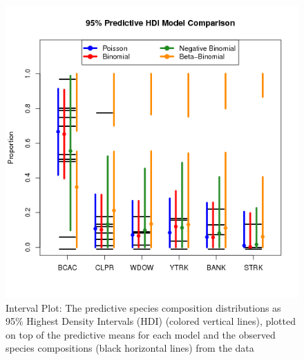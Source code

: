 \documentclass[12pt]{article}
\begin{document}
\begin{figure}[h!]
\centering
\includegraphics{./pictures/compPlot1982Qtr2.png}
\caption{Interval Plot: The predictive species composition distributions
as 95\% Highest Density Intervals (HDI) (colored vertical lines),
plotted on top of the predictive means for each model and the observed
species compositions (black horizontal lines) from the data}
\label{interval}
\end{figure}


%
%
%
\end{document}
